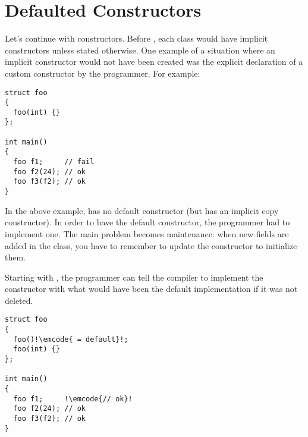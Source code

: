 \section{Defaulted Constructors}

Let's continue with constructors. Before , each class would have
implicit constructors unless stated otherwise. One example of a
situation where an implicit constructor would not have been created
was the explicit declaration of a custom constructor by the
programmer. For example:

\begin{lstlisting}
struct foo
{
  foo(int) {}
};

int main()
{
  foo f1;     // fail
  foo f2(24); // ok
  foo f3(f2); // ok
}
\end{lstlisting}

In the above example,  has no default constructor (but has
an implicit copy constructor). In order to have the default
constructor, the programmer had to implement one. The main problem
becomes maintenance: when new fields are added in the class, you have
to remember to update the constructor to initialize them.

Starting with , the programmer can tell the compiler to
implement the constructor with what would have been the default
implementation if it was not deleted.

\begin{lstlisting}
struct foo
{
  foo()!\emcode{ = default}!;
  foo(int) {}
};

int main()
{
  foo f1;     !\emcode{// ok}!
  foo f2(24); // ok
  foo f3(f2); // ok
}
\end{lstlisting}
